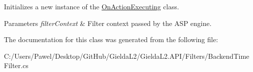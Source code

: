 Initializes a new instance of the \mbox{\hyperlink{class_gielda_l2_1_1_a_p_i_1_1_filters_1_1_backend_time_filter_a574dadcdcdbee12457c072577873497b}{On\+Action\+Executing}} class. 


\begin{DoxyParams}{Parameters}
{\em filter\+Context} & Filter context passed by the A\+SP engine.\\
\hline
\end{DoxyParams}


The documentation for this class was generated from the following file\+:\begin{DoxyCompactItemize}
\item 
C\+:/\+Users/\+Pawel/\+Desktop/\+Git\+Hub/\+Gielda\+L2/\+Gielda\+L2.\+A\+P\+I/\+Filters/Backend\+Time\+Filter.\+cs\end{DoxyCompactItemize}
